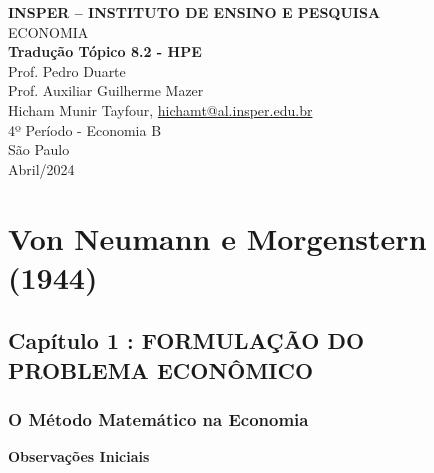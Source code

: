 \documentclass[a4paper,12pt]{article}[abntex2]
\begin{document}
\begin{titlepage}
    \centering
    \vspace*{1cm}
    \Large\textbf{INSPER – INSTITUTO DE ENSINO E PESQUISA}\\
    \Large ECONOMIA\\
    \vspace{1.5cm}
    \Large\textbf{Tradução Tópico 8.2 - HPE}\\
    \vspace{1.5cm}
    Prof. Pedro Duarte\\
    Prof. Auxiliar Guilherme Mazer\\
    \vfill
    \normalsize
    Hicham Munir Tayfour, \href{mailto:hichamt@al.insper.edu.br}{hichamt@al.insper.edu.br}\\
    4º Período - Economia B\\
    \vfill
    São Paulo\\
    Abril/2024
\end{titlepage}

\newpage
\tableofcontents
\thispagestyle{empty} %
\newpage
\setcounter{page}{1} %
\justify
\onehalfspacing

\pagestyle{fancy}
\fancyhf{}
\rhead{\thepage}

\section{\textbf{Von Neumann e Morgenstern (1944)}}

\subsection{\textbf{Capítulo 1 : FORMULAÇÃO DO PROBLEMA ECONÔMICO}}

\subsubsection{\textbf{O Método Matemático na Economia}}

\textbf{Observações Iniciais}
\end{document}
